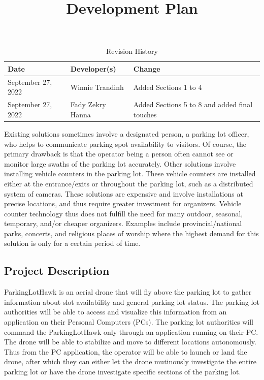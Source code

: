 \documentclass{article}
\title{Development Plan\\\progname}
\author{\authname}
\date{}
\begin{document}
\begin{table}[hp]
\caption{Revision History} \label{TblRevisionHistory}
\begin{tabularx}{\textwidth}{llX}
\toprule
\textbf{Date} & \textbf{Developer(s)} & \textbf{Change}\\
\midrule
September 27, 2022 & Winnie Trandinh & Added Sections 1 to 4\\
September 27, 2022 & Fady Zekry Hanna & Added Sections 5 to 8 and added final touches\\


\bottomrule
\end{tabularx}
\end{table}


\newpage

\maketitle

\indent Existing solutions sometimes involve a designated person, a parking lot officer, who helps to communicate parking spot availability to visitors. Of course, the primary drawback is that the operator being a person often cannot see or monitor large swaths of the parking lot accurately. Other solutions involve installing vehicle counters in the parking lot. These vehicle counters are installed either at the entrance/exits or throughout the parking lot, such as a distributed system of cameras.  These solutions are expensive and involve installations at precise locations, and thus require greater investment for organizers. Vehicle counter technology thus does not fulfill the need for many outdoor, seasonal, temporary, and/or cheaper organizers.  Examples include provincial/national parks, concerts, and religious places of worship where the highest demand for this solution is only for a certain period of time. 
\subsection{Project Description}

ParkingLotHawk is an aerial drone that will fly above the parking lot to gather information about slot availability and general parking lot status. The parking lot authorities will be able to access and visualize this information from an application on their Personal Computers (PCs). The parking lot authorities will command the ParkingLotHawk  only through an application running on their PC. The drone will be able to stabilize and move to different locations autonomously. Thus from the PC application, the operator will be able to launch or land the drone, after which they can either let the drone mutinously investigate the entire parking lot or have the drone investigate specific sections of the parking lot. 
\end{document}

